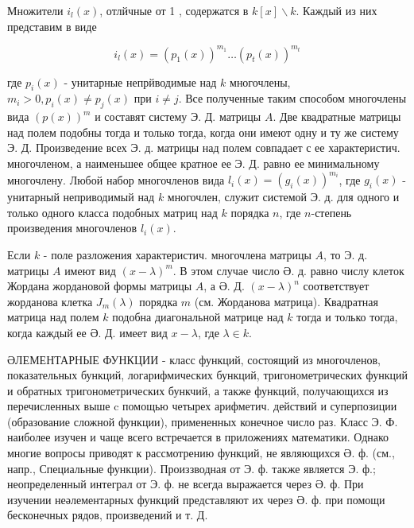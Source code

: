 \documentclass[10pt]{article}
\begin{document}
Множители $i_{l}(x)$, отлйчные от 1 , содержатся в $k[x] \backslash k$. Каждый из них представим в виде



\[

i_{l}(x)=\left(p_{1}(x)\right)^{m_{1}} \ldots\left(p_{t}(x)\right)^{m_{t}}

\]



где $p_{i}(x)$ - унитарные непрйводимые над $k$ многочлены, $m_{i}>0, p_{i}(x) \neq p_{j}(x)$ при $i \neq j$. Все полученные таким способом многочлены вида $(p(x))^{m}$ и составят систему Э. Д. матрицы $A$. Две квадратные матрицы над полем подобны тогда и только тогда, когда они имеют одну и ту же систему Э. Д. Произведение всех Э. д. матрицы над полем совпадает с ее характеристич. многочленом, а наименьшее общее кратное ее Э. Д. равно ее минимальному многочлену. Любой набор многочленов вида $l_{i}(x)=\left(g_{i}(x)\right)^{m_{i}}$, где $g_{i}(x)$ - унитарный неприводимый над $k$ многочлен, служит системой Э. д. для одного и только одного класса подобных матриц над $k$ порядка $n$, где $n$-степень произведения многочленов $l_{i}(x)$.



Если $k$ - поле разложения характеристич. многочлена матрицы $A$, то Э. д. матрицы $A$ имеют вид $(x-\lambda)^{m}$. В этом случае число Ә. д. равно числу клеток Жордана жордановой формы матрицы $A$, а Ә. Д. $(x-\lambda)^{n}$ соответствует жорданова клетка $J_{m}(\lambda)$ порядка $m$ (см. Жорданова матрица). Квадратная матрица над полем $k$ подобна диагональной матрице над $k$ тогда и только тогда, когда каждый ее Ә. Д. имеет вид $x-\lambda$, где $\lambda \in k$.



ӘЛЕМЕНТАРНЫЕ ФУНКЦИИ - класс функций, состоящий из многочленов, показательных бункций, логарифмических бункций, тригонометрических функций и обратных тригонометрических бункчий, а также функций, получающихся из перечисленных выше c помощью четырех арифметич. действий и суперпозиции (образование сложной функции), примененных конечное число раз. Класс Э. Ф. наиболее изучен и чаще всего встречается в приложениях математики. Однако многие вопросы приводят к рассмотрению функций, не являющихся Ә. ф. (см., напр., Специальные функции). Произзводная от Э. ф. также является Э. ф.; неопределенный интеграл от Э. ф. не всегда выражается через Ә. ф. При изучении неәлементарных функций представляют их через Ә. ф. при помощи бесконечных рядов, произведений и т. Д.
\end{document}
